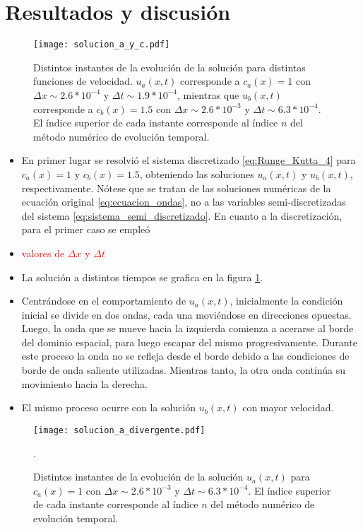 \documentclass[aps,prb,twocolumn,superscriptaddress,floatfix,longbibliography,10pt]{revtex4-2}
\newcounter{para}
\begin{document}
\section{Resultados y discusión}


\begin{figure}[h]
  \texttt{[image: solucion\_a\_y\_c.pdf]}
  \caption{Distintos instantes de la evolución de la solución para distintas funciones de velocidad. $u_a(x,t)$ corresponde a $c_a(x) = 1$ con $\Delta x \sim 2.6*10^{-4}$ y $\Delta t \sim 1.9*10^{-4}$, mientras que $u_b(x,t)$ corresponde a $c_b(x) = 1.5$ con $\Delta x \sim 2.6*10^{-3}$ y $\Delta t \sim 6.3*10^{-4}$. El índice superior de cada instante corresponde al índice $n$ del método numérico de evolución temporal.}
   \label{fig:solucion_a_y_c}
\end{figure}

\begin{itemize}
  \item En primer lugar se resolvió el sistema discretizado \ref{eq:Runge_Kutta_4} para $c_a(x) = 1$ y $c_b(x) = 1.5$, obteniendo las soluciones $u_a(x,t)$ y $u_b(x,t)$, respectivamente. Nótese que se tratan de las soluciones numéricas de la ecuación original \ref{eq:ecuacion_ondas}, no a las variables semi-discretizadas del sistema \ref{eq:sistema_semi_discretizado}. En cuanto a la discretización, para el primer caso se empleó 
  \item \textcolor{red}{valores de $\Delta x$ y $\Delta t$}
  \item La solución a distintos tiempos se grafica en la figura \ref{fig:solucion_a_y_c}.
  \item Centrándose en el comportamiento de $u_a(x,t)$, inicialmente la condición inicial se divide en dos ondas, cada una moviéndose en direcciones opuestas. Luego, la onda que se mueve hacia la izquierda comienza a acerarse al borde del dominio espacial, para luego escapar del mismo progresivamente. Durante este proceso la onda no se refleja desde el borde debido a las condiciones de borde de onda saliente utilizadas. Mientras tanto, la otra onda continúa su movimiento hacia la derecha.
  \item El mismo proceso ocurre con la solución $u_b(x,t)$ con mayor velocidad.
\end{itemize}

\begin{figure}[h]
  \texttt{[image: solucion\_a\_divergente.pdf]}
  \caption{Distintos instantes de la evolución de la solución $u_a(x,t)$ para $c_a(x) = 1$ con $\Delta x \sim 2.6*10^{-3}$ y $\Delta t \sim 6.3*10^{-4}$. El índice superior de cada instante corresponde al índice $n$ del método numérico de evolución temporal.}.
   \label{fig:solucion_a_divergente}
\end{figure}
\end{document}
